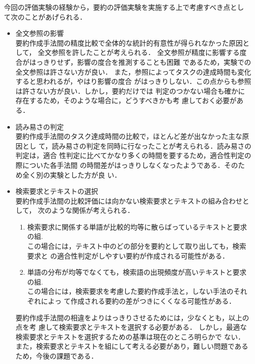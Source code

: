 今回の評価実験の経験から，要約の評価実験を実施する上で考慮すべき点とし
て次のことがあげられる．
\begin{itemize}
\item 全文参照の影響\\
要約作成手法間の精度比較で全体的な統計的有意性が得られなかった原因として，
全文参照を許したことが考えられる．
全文参照が精度に影響する度合がはっきりせず，影響の度合を推測することも困難
であるため，実験での全文参照は許さない方が良い．
また，参照によってタスクの達成時間も変化すると思われるが，やはり影響の度合
がはっきりしない．この点からも参照は許さない方が良い．しかし，要約だけでは
判定のつかない場合も確かに存在するため，そのような場合に，どうすべきかも考
慮しておく必要がある．
\item 読み易さの判定\\
要約作成手法間のタスク達成時間の比較で，ほとんど差が出なかった主な原因とし
て，読み易さの判定を同時に行なったことが考えられる．読み易さの判定は，適合
性判定に比べてかなり多くの時間を要するため，適合性判定の際についた各手法間
の時間差がはっきりしなくなったようである．そのため全く別の実験とした方が良
い．
\item 検索要求とテキストの選択\\
要約作成手法間の比較評価には向かない検索要求とテキストの組み合わせとして，
次のような関係が考えられる．
\begin{enumerate}
\item 検索要求に関係する単語が比較的均等に散らばっているテキストと要求の組.\\
この場合には，テキスト中のどの部分を要約として取り出しても，検索要求と
の適合性判定がしやすい要約が作成される可能性がある．
\item 単語の分布が均等でなくても，検索語の出現頻度が高いテキストと要求の組.\\
この場合には，検索要求を考慮した要約作成手法と，しない手法のそれぞれによっ
て作成される要約の差がつきにくくなる可能性がある．
\end{enumerate}

要約作成手法間の相違をよりはっきりさせるためには，少なくとも，以上の点を考
慮して検索要求とテキストを選択する必要がある．
しかし，最適な検索要求とテキストを選択するための基準は現在のところ明らかで
ない．また，検索要求とテキストを組にして考える必要があり，難しい問題である
ため，今後の課題である．
\end{itemize}

\vspace{5mm}

\acknowledgment

